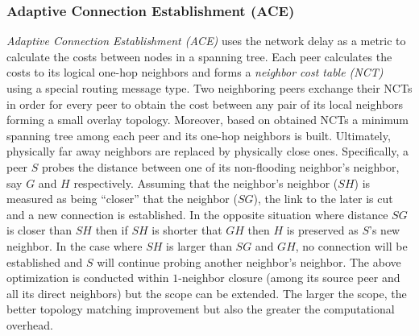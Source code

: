 \subsubsection{Adaptive Connection Establishment (ACE)}
\emph{Adaptive Connection Establishment (ACE)} \cite{LZXN2004} uses the network
delay as a metric to calculate the costs between nodes in a spanning tree.
Each peer calculates the costs to its logical one-hop
neighbors and forms a \emph{neighbor cost table (NCT)} using a special
routing message type. Two neighboring peers exchange their NCTs in order for
every peer to obtain the cost between any pair of its local neighbors forming a
small overlay topology. Moreover, based on obtained NCTs a minimum spanning tree
among each peer and its one-hop neighbors is built. Ultimately, physically
far away neighbors are replaced by physically close ones. Specifically, a peer
$S$ probes the distance between one of its non-flooding neighbor's neighbor,
say $G$ and $H$ respectively. Assuming that the neighbor's neighbor ($SH$) is
measured as being ``closer'' that the neighbor ($SG$), the link to the later
is cut and a new connection is established. In the opposite situation where
distance $SG$ is closer than $SH$ then if $SH$ is shorter that $GH$ then $H$ is
preserved as $S$'s new neighbor. In the case where $SH$ is larger than $SG$ and
$GH$, no connection will be established and $S$ will continue probing another
neighbor's neighbor. The above optimization is conducted within $1$-neighbor
closure (among its source peer and all its direct neighbors) but the scope can
be extended. The larger the scope, the better topology matching improvement but
also the greater the computational overhead.

%
%
%

